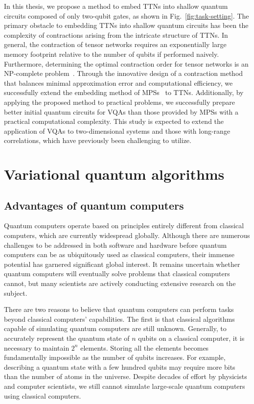 \documentclass[12pt,dvipdfmx,twoside,openright]{report}
\begin{document}
In this thesis, we propose a method to embed TTNs into shallow quantum circuits composed of only two-qubit gates, as shown in Fig.~\ref{fig:task-setting}.
The primary obstacle to embedding TTNs into shallow quantum circuits has been the complexity of contractions arising from the intricate structure of TTNs.
In general, the contraction of tensor networks requires an exponentially large memory footprint relative to the number of qubits if performed naively.
Furthermore, determining the optimal contraction order for tensor networks is an NP-complete problem~\cite{np-complete}.
Through the innovative design of a contraction method that balances minimal approximation error and computational efficiency, we successfully extend the embedding method of MPSs~\cite{mpsdecomp} to TTNs.
Additionally, by applying the proposed method to practical problems, we successfully prepare better initial quantum circuits for VQAs than those provided by MPSs with a practical computational complexity.
This study is expected to extend the application of VQAs to two-dimensional systems and those with long-range correlations, which have previously been challenging to utilize.

\cleardoublepage
\chapter{Variational quantum algorithms}
\section{Advantages of quantum computers}
Quantum computers operate based on principles entirely different from classical computers, which are currently widespread globally.
Although there are numerous challenges to be addressed in both software and hardware before quantum computers can be as ubiquitously used as classical computers, their immense potential has garnered significant global interest. 
It remains uncertain whether quantum computers will eventually solve problems that classical computers cannot, but many scientists are actively conducting extensive research on the subject.

There are two reasons to believe that quantum computers can perform tasks beyond classical computers' capabilities.
The first is that classical algorithms capable of simulating quantum computers are still unknown.
Generally, to accurately represent the quantum state of $n$ qubits on a classical computer, it is necessary to maintain $2^n$ elements.
Storing all the elements becomes fundamentally impossible as the number of qubits increases.
For example, describing a quantum state with a few hundred qubits may require more bits than the number of atoms in the universe.
Despite decades of effort by physicists and computer scientists, we still cannot simulate large-scale quantum computers using classical computers.
\end{document}

